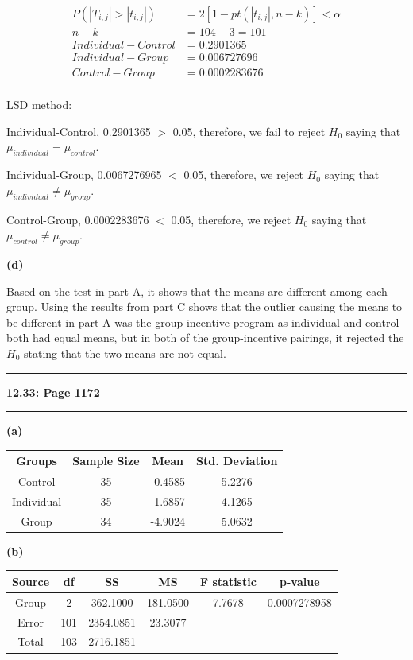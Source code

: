 \documentclass[11pt]{article}
\newcommand\question[2]{\vspace{.25in}\hrule\textbf{#1: #2}\vspace{.5em}\hrule\vspace{.10in}}
\renewcommand\part[1]{\vspace{.10in}\textbf{(#1)}\par}
\begin{document}
		\begin{align*}
			P(|T_{i,j}| > |t_{i,j}|) &= 2[1-pt(|t_{i,j}|, n-k)] < \alpha \\
			n-k &= 104-3=101\\
			Individual-Control &= 0.2901365\\
			Individual-Group &= 0.006727696\\
			Control-Group &= 0.0002283676\\
		\end{align*}\par
		
		LSD method:\par
		Individual-Control, 0.2901365 $>$ 0.05, therefore, we fail to reject $H_{0}$ saying that $\mu_{individual}=\mu_{control}$.\par
		Individual-Group, 0.0067276965 $<$ 0.05, therefore, we reject $H_{0}$ saying that $\mu_{individual} \ne \mu_{group}$.\par
		Control-Group, 0.0002283676 $<$ 0.05, therefore, we reject $H_{0}$ saying that $\mu_{control} \ne \mu_{group}$.\par
	\part{d}
    Based on the test in part A, it shows that the means are different among each group. 
    Using the results from part C shows that the outlier causing the means to be different in 
    part A was the group-incentive program as individual and control both had equal means, but in 
    both of the group-incentive pairings, it rejected the $H_{0}$ stating that the two means are not 
    equal.\par
	

\question{12.33}{Page 1172}
	\part{a}
		\begin{tabular}{|c|c|c|c|}
			\hline
			Groups & Sample Size & Mean & Std. Deviation\\
			\hline
			Control & 35 & -0.4585 & 5.2276\\
			\hline
			Individual & 35 & -1.6857 & 4.1265\\
			\hline
			Group & 34 & -4.9024 & 5.0632\\
			\hline
		\end{tabular}\par
	
	\part{b}
		\begin{tabular}{|c|c|c|c|c|c|}
			\hline
			Source & df & SS & MS & F statistic & p-value\\
			\hline
			Group & 2 & 362.1000 & 181.0500 & 7.7678 & 0.0007278958\\
			\hline
			Error & 101 & 2354.0851 & 23.3077 & &\\
			\hline
			Total & 103 & 2716.1851 &&&\\
			\hline
		\end{tabular}\par
\end{document}
